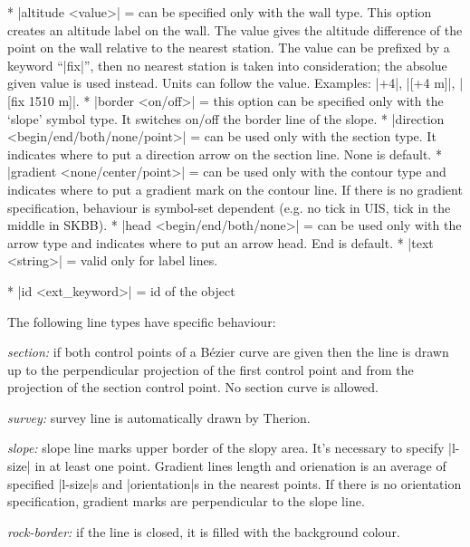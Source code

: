        * |altitude <value>| = can be specified only with the wall type.
         This option creates an altitude label on the wall. The value
         gives the altitude difference of the point on the wall 
         relative to the nearest station. The value can be prefixed
         by a keyword ``|fix|'', then no nearest station is taken into
         consideration; the absolue given value is used instead.
         Units can follow the value. Examples: |+4|, |[+4 m]|,
         |[fix 1510 m]|.
       * |border <on/off>| = this option can be specified only with
         the `slope' symbol type. It switches on/off the border line of 
         the slope.
       * |direction <begin/end/both/none/point>| = can be used only
         with the section type. It indicates where to put 
         a direction arrow on the section line. None is default.
       * |gradient <none/center/point>| = can be used only with the contour
         type and indicates where to put a gradient mark on the contour line.
         If there is no gradient specification, behaviour is symbol-set 
         dependent (e.g. no tick in UIS, tick in the middle in SKBB).
       * |head <begin/end/both/none>| = can be used only with the arrow
         type and indicates where to put an arrow head. End is default.
       * |text <string>| = valid only for label lines.
\endcomopt

\options
  * |id <ext_keyword>| = id of the object
\endoptions

\notes
   The following line types have specific behaviour:

   \list
       {\it section:} if both control points of a B\'ezier curve are given 
       then the line is drawn up to the perpendicular projection of 
       the first control point and from the projection of the section control
       point. No section curve is allowed.
       
       {\it survey:} survey line is automatically drawn by Therion.
       
       {\it slope:} slope line marks upper border of the slopy area. It's 
       necessary to specify |l-size| in at least one point. Gradient lines
       length and orienation is an average of specified |l-size|s and
       |orientation|s in the nearest points. If there is no orientation
       specification, gradient marks are perpendicular to the slope line.
       
       {\it rock-border:} if the line is closed, it is filled with the 
       background colour.
   \endlist
\endnotes


